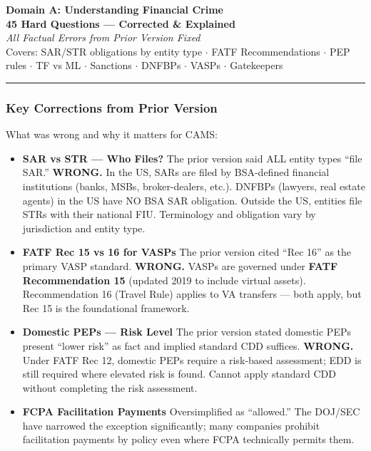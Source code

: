 \documentclass[12pt,aspectratio=169]{beamer}
\renewcommand{\scriptsize}{\fontsize{5}{6}\selectfont}
\newcommand{\highlight}[1]{\textcolor{redcorrect}{\textbf{#1}}}
\begin{document}
	
	\begin{frame}
		\centering
		\vspace{0.5cm}
		{\fontsize{16}{19}\selectfont \textbf{Domain A: Understanding Financial Crime}}\\[0.15cm]
		{\fontsize{12}{14}\selectfont \textbf{45 Hard Questions --- Corrected \& Explained}}\\[0.3cm]
		{\fontsize{9}{11}\selectfont \textit{All Factual Errors from Prior Version Fixed}}\\[0.2cm]
		{\fontsize{8}{10}\selectfont Covers: SAR/STR obligations by entity type $\cdot$ FATF Recommendations $\cdot$ PEP rules $\cdot$ TF vs ML $\cdot$ Sanctions $\cdot$ DNFBPs $\cdot$ VASPs $\cdot$ Gatekeepers}
		\vspace{0.2cm}
		\rule{4cm}{0.5pt}
	\end{frame}
	
	\begin{frame}
		\frametitle{\fontsize{11}{13}\selectfont Key Corrections from Prior Version}
		\scriptsize
		\begin{block}{\fontsize{8}{10}\selectfont What was wrong and why it matters for CAMS:}
			\vspace{0.04cm}
			\scriptsize
			\begin{itemize}
				\item \highlight{SAR vs STR --- Who Files?} The prior version said ALL entity types ``file SAR.'' \textbf{WRONG.} In the US, SARs are filed by BSA-defined financial institutions (banks, MSBs, broker-dealers, etc.). DNFBPs (lawyers, real estate agents) in the US have NO BSA SAR obligation. Outside the US, entities file STRs with their national FIU. Terminology and obligation vary by jurisdiction and entity type.
				\item \highlight{FATF Rec 15 vs 16 for VASPs} The prior version cited ``Rec 16'' as the primary VASP standard. \textbf{WRONG.} VASPs are governed under \textbf{FATF Recommendation 15} (updated 2019 to include virtual assets). Recommendation 16 (Travel Rule) applies to VA transfers --- both apply, but Rec 15 is the foundational framework.
				\item \highlight{Domestic PEPs --- Risk Level} The prior version stated domestic PEPs present ``lower risk'' as fact and implied standard CDD suffices. \textbf{WRONG.} Under FATF Rec 12, domestic PEPs require a risk-based assessment; EDD is still required where elevated risk is found. Cannot apply standard CDD without completing the risk assessment.
				\item \highlight{FCPA Facilitation Payments} Oversimplified as ``allowed.'' The DOJ/SEC have narrowed the exception significantly; many companies prohibit facilitation payments by policy even where FCPA technically permits them.
			\end{itemize}
		\end{block}
	\end{frame}
	
\end{document}
